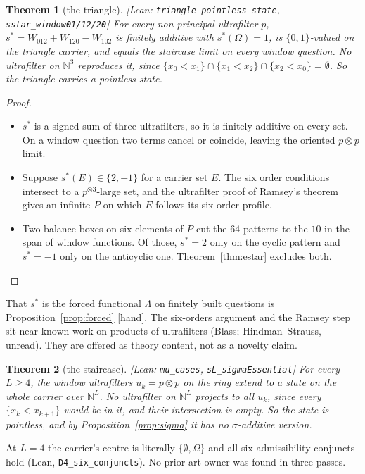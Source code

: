 \documentclass[11pt]{article}
\theoremstyle{plain}
\newtheorem{theorem}{Theorem}[section]
\theoremstyle{definition}
\newcommand{\bbN}{\mathbb{N}}
\newcommand{\st}[1]{\textsf{\small[#1]}}
\begin{document}
\begin{theorem}[the triangle]\label{thm:triangle}\st{Lean:
\texttt{triangle\_pointless\_state}, \texttt{sstar\_window01/12/20}}
For every non-principal ultrafilter $p$, $s^{*}=W_{012}+W_{120}-W_{102}$ is
finitely additive with $s^*(\Omega)=1$, is $\{0,1\}$-valued on the triangle
carrier, and equals the staircase limit on every window question. No ultrafilter
on $\bbN^3$ reproduces it, since $\{x_0<x_1\}\cap\{x_1<x_2\}\cap\{x_2<x_0\}=\emptyset$.
So the triangle carries a pointless state.
\end{theorem}
\begin{proof}
\begin{itemize}[nosep]
  \item $s^*$ is a signed sum of three ultrafilters, so it is finitely additive
    on every set. On a window question two terms cancel or coincide, leaving
    the oriented $p\otimes p$ limit.
  \item Suppose $s^*(E)\in\{2,-1\}$ for a carrier set $E$. The six order
    conditions intersect to a $p^{\otimes3}$-large set, and the ultrafilter
    proof of Ramsey's theorem gives an infinite $P$ on which $E$ follows its
    six-order profile.
  \item Two balance boxes on six elements of $P$ cut the $64$ patterns to the
    $10$ in the span of window functions. Of those, $s^*=2$ only on the cyclic
    pattern and $s^*=-1$ only on the anticyclic one. Theorem~\ref{thm:estar}
    excludes both.\qedhere
\end{itemize}
\end{proof}
\noindent That $s^*$ is the forced functional $\Lambda$ on finitely built
questions is Proposition~\ref{prop:forced} \st{hand}. The six-orders argument
and the Ramsey step sit near known work on products of ultrafilters (Blass;
Hindman--Strauss, unread). They are offered as theory content, not as a novelty
claim.

\begin{theorem}[the staircase]\label{thm:witness}\st{Lean: \texttt{mu\_cases},
\texttt{sL\_sigmaEssential}}
For every $L\ge4$, the window ultrafilters $u_k=p\otimes p$ on the ring extend to
a state on the whole carrier over $\bbN^L$. No ultrafilter on $\bbN^L$ projects
to all $u_k$, since every $\{x_k<x_{k+1}\}$ would be in it, and their
intersection is empty. So the state is pointless, and by
Proposition~\ref{prop:sigma} it has no $\sigma$-additive version.
\end{theorem}
\noindent At $L=4$ the carrier's centre is literally $\{\emptyset,\Omega\}$ and
all six admissibility conjuncts hold (Lean, \texttt{D4\_six\_conjuncts}). No
prior-art owner was found in three passes.
\end{document}

